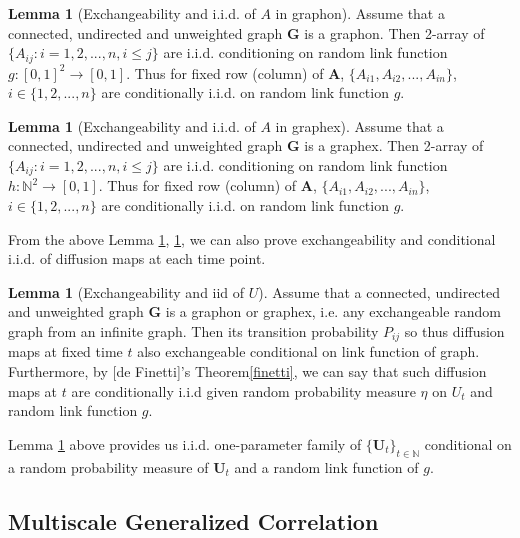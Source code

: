 \documentclass[12pt]{article}
\theoremstyle{definition}
\newtheorem{lemma}[theorem]{Lemma}
\begin{document}
\begin{lemma}[Exchangeability and i.i.d. of $A$ in graphon]
	\label{lemma1}
	Assume that a connected, undirected and unweighted graph $\mathbf{G}$ is a graphon. Then 2-array of $\{ A_{ij} : i = 1,2,... ,n , i \leq j \}$ are i.i.d. conditioning on random link function $g : [0,1]^2 \rightarrow [0,1]$. Thus for fixed row (column) of $\mathbf{A}$, $\{ A_{i1}, A_{i2}, ... , A_{in} \}$, $i \in \{ 1,2,... , n \}$ are conditionally i.i.d. on random link function $g$.  
\end{lemma}



\begin{lemma}[Exchangeability and i.i.d. of $A$ in graphex]
	\label{lemma2}
	Assume that a connected, undirected and unweighted graph $\mathbf{G}$ is a graphex. Then 2-array of $\{ A_{ij} : i = 1,2,... ,n , i \leq j \}$ are i.i.d. conditioning on random link function $h : \mathbb{N}^2 \rightarrow [0,1]$. Thus for fixed row (column) of $\mathbf{A}$, $\{ A_{i1}, A_{i2}, ... , A_{in} \}$, $i \in \{ 1,2,... , n \}$ are conditionally i.i.d. on random link function $g$.   
\end{lemma}


From the above Lemma \ref{lemma1}, \ref{lemma2}, we can also prove exchangeability and conditional i.i.d. of diffusion maps at each time point. 

\begin{lemma}[Exchangeability and iid of $U$]
	\label{lemma3}
Assume that a connected, undirected and unweighted graph $\mathbf{G}$ is a graphon or graphex, i.e. any exchangeable random graph from an infinite graph. Then its transition probability $P_{ij}$ so thus  diffusion maps at fixed time $t$ also exchangeable conditional on link function of graph. Furthermore, by [de Finetti]'s Theorem\ref{finetti}, we can say that such diffusion maps at $t$ are conditionally i.i.d given random probability measure $\eta$ on $U_{t}$ and random link function $g$.    
\end{lemma}


Lemma \ref{lemma3} above provides us i.i.d. one-parameter family of $\{ \mathbf{U}_{t} \}_{t \in \mathbb{N}}$ conditional on a random probability measure of $\mathbf{U}_{t}$ and a random link function of $g$.


\newpage
\subsection{Multiscale Generalized Correlation}
\end{document}

